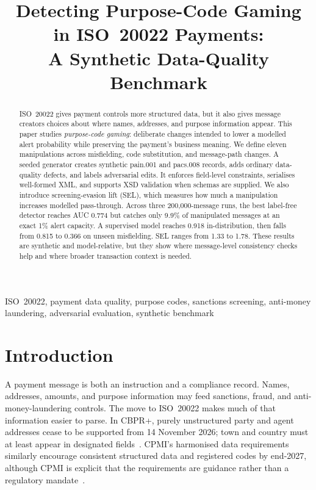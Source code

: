 \documentclass[conference]{IEEEtran}
\newif\ifanonymous
\begin{document}
\title{Detecting Purpose-Code Gaming in ISO~20022 Payments:\\
A Synthetic Data-Quality Benchmark}

\ifanonymous
\author{\IEEEauthorblockN{Anonymous Author(s)}}
\else
\author{
}
\fi

\maketitle

\begin{abstract}
ISO~20022 gives payment controls more structured data, but it also gives
message creators choices about where names, addresses, and purpose information
appear. This paper studies \emph{purpose-code gaming}: deliberate changes
intended to lower a modelled alert probability while preserving the payment's
business meaning. We define eleven manipulations across misfielding, code
substitution, and message-path changes. A seeded generator creates synthetic
pain.001 and pacs.008 records, adds ordinary data-quality defects, and labels
adversarial edits. It enforces field-level constraints, serialises well-formed
XML, and supports XSD validation when schemas are supplied. We also introduce
screening-evasion lift (SEL), which measures how much a manipulation increases
modelled pass-through. Across three 200,000-message runs, the best label-free
detector reaches AUC 0.774 but catches only 9.9\% of manipulated messages at an
exact 1\% alert capacity. A supervised model reaches 0.918 in-distribution,
then falls from 0.815 to 0.366 on unseen misfielding. SEL ranges from 1.33 to
1.78. These results are synthetic and model-relative, but they show where
message-level consistency checks help and where broader transaction context is
needed.
\end{abstract}

\begin{IEEEkeywords}
ISO~20022, payment data quality, purpose codes, sanctions screening,
anti-money laundering, adversarial evaluation, synthetic benchmark
\end{IEEEkeywords}

\section{Introduction}
A payment message is both an instruction and a compliance record. Names,
addresses, amounts, and purpose information may feed sanctions, fraud, and
anti-money-laundering controls. The move to ISO~20022 makes much of that
information easier to parse. In CBPR+, purely unstructured party and agent
addresses cease to be supported from 14 November 2026; town and country must
at least appear in designated fields~\cite{swift2026addr}. CPMI's harmonised
data requirements similarly encourage consistent structured data and
registered codes by end-2027, although CPMI is explicit that the requirements
are guidance rather than a regulatory mandate~\cite{cpmi2026}.
\end{document}
